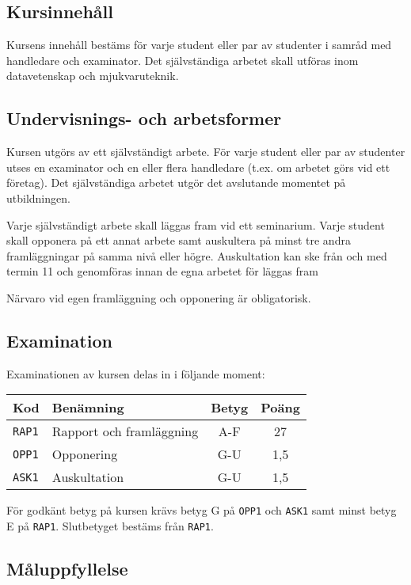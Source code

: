 \subsection*{Kursinnehåll}

Kursens innehåll bestäms för varje student eller par av studenter i
samråd med handledare och examinator. Det självständiga arbetet skall
utföras inom datavetenskap och mjukvaruteknik.

\subsection*{Undervisnings- och
arbetsformer}

Kursen utgörs av ett självständigt arbete. För varje student eller par
av studenter utses en examinator och en eller flera handledare (t.ex. om
arbetet görs vid ett företag). Det självständiga arbetet utgör det
avslutande momentet på utbildningen.

Varje självständigt arbete skall läggas fram vid ett seminarium. Varje
student skall opponera på ett annat arbete samt auskultera på minst tre
andra framläggningar på samma nivå eller högre. Auskultation kan ske
från och med termin 11 och genomföras innan de egna arbetet för läggas
fram

Närvaro vid egen framläggning och opponering är obligatorisk.

\subsection*{Examination}

Examinationen av kursen delas in i följande moment:

\begin{longtable}[]{@{}llcc@{}}
\toprule
\textsf{Kod} & \textsf{Benämning} & \textsf{Betyg} & \textsf{Poäng}\tabularnewline
\midrule
\endhead
\texttt{RAP1} & Rapport och framläggning & A-F & 27\tabularnewline
\texttt{OPP1} & Opponering & G-U & 1,5\tabularnewline
\texttt{ASK1} & Auskultation & G-U & 1,5\tabularnewline
\bottomrule
\end{longtable}

För godkänt betyg på kursen krävs betyg G på \texttt{OPP1} och \texttt{ASK1} samt minst
betyg E på \texttt{RAP1}. Slutbetyget bestäms från \texttt{RAP1}.

\subsection*{Måluppfyllelse}


